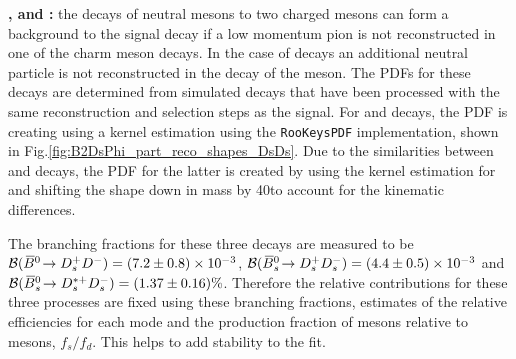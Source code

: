 \begin{description}
\item \textbf{\decay{\Bsb}{\Dsp\Dsm}, \decay{\Bzb}{\Dsp\Dm} and \decay{\Bsb}{\Dssp\Dsm}:} the decays of neutral \B mesons to two charged \D mesons can form a background to the signal decay if a low momentum pion is not reconstructed in one of the charm meson decays. In the case of \decay{\Bsb}{\Dssp\Dsm} decays an additional neutral particle is not reconstructed in the decay of the \Dssp meson.
The PDFs for these decays are determined from simulated decays that have been processed with the same reconstruction and selection steps as the signal. For \decay{\Bsb}{\Dsp\Dsm} and \decay{\Bsb}{\Dssp\Dsm} decays, the PDF is creating using a kernel estimation using the \roofit \texttt{RooKeysPDF} implementation, shown in Fig.\ref{fig:B2DsPhi_part_reco_shapes_DsDs}. Due to the similarities between \decay{\Bsb}{\Dsp\Dsm} and \decay{\Bzb}{\Dsp\Dm} decays, the PDF for the latter is created by using the kernel estimation for \decay{\Bsb}{\Dsp\Dsm} and shifting the shape down in mass by 40\mevcc to account for the kinematic differences. 

The branching fractions for these three decays are measured to be ${\mathcal{B}}({{\kern 0.18em\overline{\kern -0.18em B}{}}{}^0}\!\rightarrow {\ensuremath{{D}^+_{s}}}{\ensuremath{{D}^-}}) = (7.2 \pm 0.8 ) \times 10^{-3}$, ${\mathcal{B}}({{\kern 0.18em\overline{\kern -0.18em B}{}}{}^0_{s}}\!\rightarrow {\ensuremath{{D}^+_{s}}}{\ensuremath{{D}^-_{s}}}) = (4.4 \pm 0.5 ) \times 10^{-3}$ and ${\mathcal{B}}({{\kern 0.18em\overline{\kern -0.18em B}{}}{}^0_{s}}\!\rightarrow {\ensuremath{{D}^{*+}_{s}}}{\ensuremath{{D}^-_{s}}}) = (1.37 \pm 0.16 ) \%$. Therefore the relative contributions for these three processes are fixed using these branching fractions, estimates of the relative efficiencies for each mode and the production fraction of \Bsb mesons relative to \Bzb mesons, $f_{s}/f_{d}$. This helps to add stability to the fit.   
\end{description}


